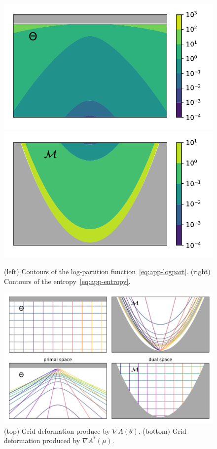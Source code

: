 \documentclass[twoside]{article}
\newcommand{\logpart}{A}
\newcommand{\conj}{{\logpart^*}}
\newcommand{\nat}{\theta}
\newcommand{\m}{\mu}
\begin{document}
\begin{figure}[ht]
	\centering
	\includegraphics[width=.45\textwidth]{figs/2d/logpart.pdf}
	\includegraphics[width=.45\textwidth]{figs/2d/entropy.pdf}
	\caption{
	(left) Contours of the log-partition function~\eqref{eq:app-logpart}.
	(right) Contours of the entropy~\eqref{eq:app-entropy}.
	}
	\label{fig:logpart-entropy}
\end{figure}

\begin{figure}[ht]
	\centering
	\includegraphics[width=.9\textwidth]{figs/2d/mirrormap.pdf}
	\caption{
	(top) Grid deformation produce by $\nabla \logpart(\nat)$.
	(bottom) Grid deformation produced by $\nabla\conj(\m)$.
	}
	\label{fig:mirrormaps}
\end{figure}
\end{document}
